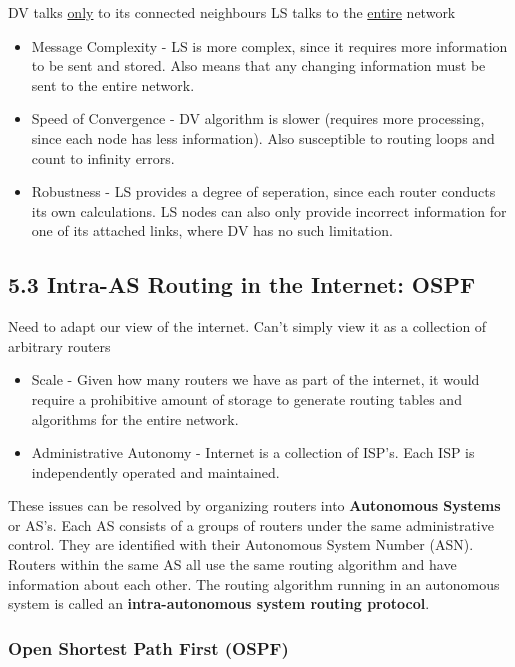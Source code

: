\documentclass[11pt]{article}
\begin{document}
DV talks \uline{only} to its connected neighbours
LS talks to the \uline{entire} network

\begin{itemize}
\item Message Complexity - LS is more complex, since it requires more information to be sent and stored. Also means that any changing information must be sent to the entire network.
\item Speed of Convergence - DV algorithm is slower (requires more processing, since each node has less information). Also susceptible to routing loops and count to infinity errors.
\item Robustness - LS provides a degree of seperation, since each router conducts its own calculations. LS nodes can also only provide incorrect information for one of its attached links, where DV has no such limitation.
\end{itemize}

\subsection{5.3 Intra-AS Routing in the Internet: OSPF}
\label{sec:org821d227}

Need to adapt our view of the internet.
Can't simply view it as a collection of arbitrary routers

\begin{itemize}
\item Scale - Given how many routers we have as part of the internet, it would require a prohibitive amount of storage to generate routing tables and algorithms for the entire network.
\item Administrative Autonomy - Internet is a collection of ISP's. Each ISP is independently operated and maintained.
\end{itemize}


These issues can be resolved by organizing routers into \textbf{Autonomous Systems} or AS's.
Each AS consists of a groups of routers under the same administrative control.
They are identified with their Autonomous System Number (ASN).
Routers within the same AS all use the same routing algorithm and have information about each other. The routing algorithm running in an autonomous system is called an \textbf{intra-autonomous system routing protocol}.

\subsubsection{Open Shortest Path First (OSPF)}
\label{sec:orga4db1c8}
\end{document}
